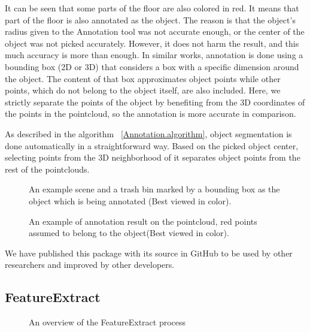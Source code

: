 It can be seen that some parts of the floor are also colored in red. It means that part of the floor is also annotated as the object. The reason is that the object's radius given to the Annotation tool was not accurate enough, or the center of the object was not picked accurately. However, it does not harm the result, and this much accuracy is more than enough. In similar works, annotation is done using a bounding box (2D or 3D) that considers a box with a specific dimension around the object. The content of that box approximates object points while other points, which do not belong to the object itself, are also included. Here, we strictly separate the points of the object by benefiting from the 3D coordinates of the points in the 
pointcloud, so the annotation is more accurate in comparison.


As described in the algorithm ~\ref{Annotation.algorithm}, object segmentation is done automatically in a straightforward way. Based on the picked object center, selecting points from the 3D neighborhood of it separates object points from the 
rest of the pointclouds.

\begin{figure}[t]
  \caption[Example scene and object for Annotation tool]
  {An example scene and a trash bin marked by a bounding box as the object which is being annotated (Best viewed in color).}
  \label{TrashbinBounding.figure}
\end{figure}

\begin{figure}[t]
  \caption[Annotation tool result]
  {An example of annotation result on the pointcloud, red points assumed to belong to the object(Best viewed in color).}
  \label{Annotation.figure}
\end{figure}

We have published this package with its source in GitHub to be used by other researchers and improved by other developers.\cite{AnnotationGithub}



\subsection{FeatureExtract}
\label{FeatureExtract.ssec}

\begin{figure}[t]
  \centering
  \caption[FeatureExtract Overview Flowchart]
  {An overview of the FeatureExtract process}
  \label{FeatureExtractFlowchart.figure}
\end{figure}


